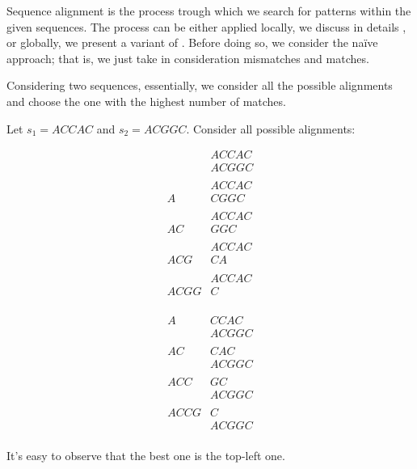 \documentclass{subfiles}
\begin{document}
    Sequence alignment is the process trough which we search for patterns 
        within the given sequences. The process can be either applied locally,
        we discuss in details \cite{smith1981}, or globally, we present a variant of \cite{needleman1970}.
        Before doing so, we consider the na\"ive approach; that is, 
        we just take in consideration mismatches and matches. 

    Considering two sequences, essentially, we consider all the possible alignments 
        and choose the one with the highest number of matches.
        \begin{example*}
            Let \(s_{1} = ACCAC\) and \(s_{2} = ACGGC\). Consider all possible alignments:
            {\setlength{\jot}{0pt}
            \begin{minipage}{0.45\textwidth} 
            \[\begin{aligned}
                    & ACCAC \\
                    & ACGGC \\ 
                            \\ 
                    & ACCAC \\ 
                    A &CGGC \\
                            \\ 
                    & ACCAC \\ 
                    AC &GGC \\ 
                            \\ 
                    & ACCAC \\ 
                    ACG& CA \\ 
                            \\ 
                    & ACCAC \\
                    ACGG &C \\
            \end{aligned}\]
            \end{minipage}
            \begin{minipage}{0.45\textwidth}
                \[\begin{aligned}
                    A& CCAC \\
                    & ACGGC \\ 
                            \\
                    AC &CAC \\ 
                    & ACGGC \\
                            \\
                    ACC &GC \\
                    & ACGGC \\ 
                            \\ 
                    ACCG &C \\ 
                    & ACGGC \\ 
                \end{aligned}\]
            \end{minipage}}
            
            It's easy to observe that the best one is the top-left one.
        \end{example*}
\end{document}
